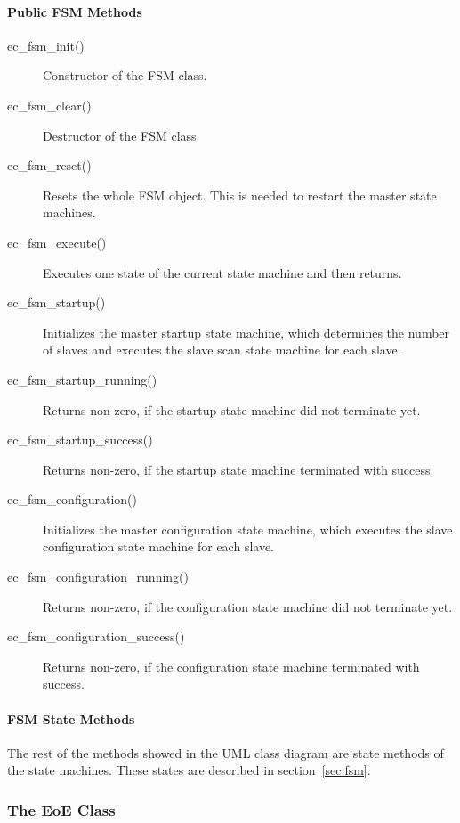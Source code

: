 \documentclass[a4paper,12pt,BCOR6mm,bibtotoc,idxtotoc]{scrbook}
\begin{document}
\paragraph{Public FSM Methods}

\begin{description}
\item[ec\_fsm\_init()] Constructor of the FSM class.
\item[ec\_fsm\_clear()] Destructor of the FSM class.
\item[ec\_fsm\_reset()] Resets the whole FSM object. This is needed to
  restart the master state machines.
\item[ec\_fsm\_execute()] Executes one state of the current state
  machine and then returns.
\item[ec\_fsm\_startup()] Initializes the master startup state
  machine, which determines the number of slaves and executes the
  slave scan state machine for each slave.
\item[ec\_fsm\_startup\_running()] Returns non-zero, if the startup
  state machine did not terminate yet.
\item[ec\_fsm\_startup\_success()] Returns non-zero, if the startup
  state machine terminated with success.
\item[ec\_fsm\_configuration()] Initializes the master configuration
  state machine, which executes the slave configuration state machine
  for each slave.
\item[ec\_fsm\_configuration\_running()] Returns non-zero, if the
  configuration state machine did not terminate yet.
\item[ec\_fsm\_configuration\_success()] Returns non-zero, if the
  configuration state machine terminated with success.
\end{description}

\paragraph{FSM State Methods}

The rest of the methods showed in the UML class diagram are state
methods of the state machines. These states are described in
section~\ref{sec:fsm}.


\subsubsection{The EoE Class}
\label{sec:class-eoe}
\end{document}
